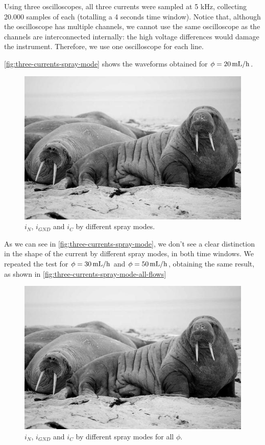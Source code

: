 \documentclass[oneside,12pt]{article}
\begin{document}
Using three oscilloscopes, all three currents were sampled at 5 kHz, collecting 20.000 samples of each
(totalling a 4 seconds time window). Notice that, although the oscilloscope has multiple channels, 
we cannot use the same oscilloscope as the channels are interconnected internally: the high voltage 
differences would damage the instrument. Therefore, we use one oscilloscope for each line. 

\autoref{fig:three-currents-spray-mode} shows the waveforms obtained for $\phi = 20 \,\mathrm{mL/h}$.

\begin{figure}[h!]
    \centering
    \includegraphics[width=.8\textwidth,trim=1 1 1 1,clip]{figures/lorem-picsum.jpg}
    \caption{$i_N$, $i_{GND}$ and $i_C$ by different spray modes.}
    \label{fig:three-currents-spray-mode}
\end{figure}

As we can see in \autoref{fig:three-currents-spray-mode}, we don't see a clear distinction in the shape of the current 
by different spray modes, in both time windows. We repeated the test for $\phi = 30 \,\mathrm{mL/h}$ and $\phi = 50 \,\mathrm{mL/h}$,
obtaining the same result, as shown in \autoref{fig:three-currents-spray-mode-all-flows}

\begin{figure}[h!]
    \centering
    \includegraphics[width=.8\textwidth,trim=1 1 1 1,clip]{figures/lorem-picsum.jpg}
    \caption{$i_N$, $i_{GND}$ and $i_C$ by different spray modes for all $\phi$.}
    \label{fig:three-currents-spray-mode-all-flows}
\end{figure}
\end{document}
